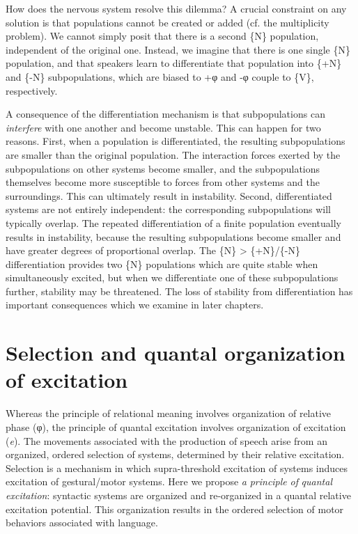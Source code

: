   How does the nervous system resolve this dilemma? A crucial constraint on any solution is that populations cannot be created or added (cf. the multiplicity problem). We cannot simply posit that there is a second \{N\} population, independent of the original one. Instead, we imagine that there is one single \{N\} population, and that speakers learn to differentiate that population into \{+N\} and \{-N\} subpopulations, which are biased to +φ and -φ couple to \{V\}, respectively.

  A consequence of the differentiation mechanism is that subpopulations can \textit{interfere} with one another and become unstable. This can happen for two reasons. First, when a population is differentiated, the resulting subpopulations are smaller than the original population. The interaction forces exerted by the subpopulations on other systems become smaller, and the subpopulations themselves become more susceptible to forces from other systems and the surroundings. This can ultimately result in instability. Second, differentiated systems are not entirely independent: the corresponding subpopulations will typically overlap. The repeated differentiation of a finite population eventually results in instability, because the resulting subpopulations become smaller and have greater degrees of proportional overlap. The \{N\} > \{+N\}/\{-N\} differentiation provides two \{N\} populations which are quite stable when simultaneously excited, but when we differentiate one of these subpopulations further, stability may be threatened. The loss of stability from differentiation has important consequences which we examine in later chapters.

\section{Selection and quantal organization of excitation}

Whereas the principle of relational meaning involves organization of relative phase (φ), the principle of quantal excitation involves organization of excitation (\textit{e}). The movements associated with the production of speech arise from an organized, ordered selection of systems, determined by their relative excitation. Selection is a mechanism in which supra-threshold excitation of systems induces excitation of gestural/motor systems. Here we propose \textit{a} \textit{principle} \textit{of} \textit{quantal} \textit{excitation}: syntactic systems are organized and re-organized in a quantal relative excitation potential. This organization results in the ordered selection of motor behaviors associated with language.

